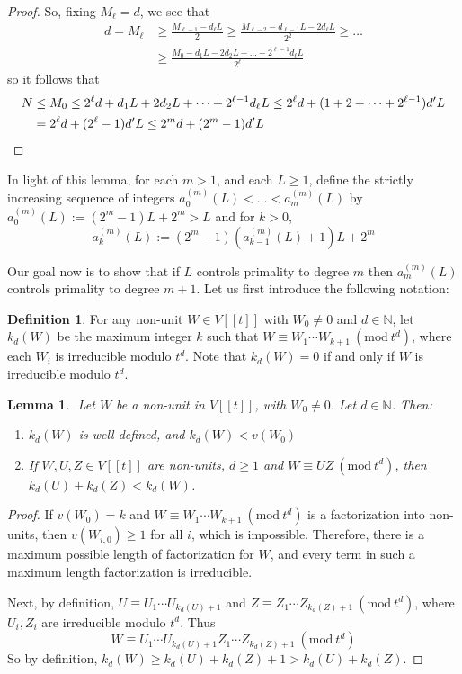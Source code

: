 \documentclass{article}
\newcommand{\N}{\mathbb{N}}
\newcommand{\Mod}[1]{\ (\mathrm{mod}\ #1)}
\theoremstyle{plain}
\newtheorem{lemma}[theorem]{Lemma}
\theoremstyle{definition}
\newtheorem{definition}[theorem]{Definition}
\theoremstyle{remark}
\theoremstyle{plain}
\begin{document}
\begin{proof}
\noindent So, fixing $M_\ell=d$, we see that 
\begin{align*}
d=M_\ell&\geq \frac{M_{\ell-1}-d_{\ell}L}{2}\geq \frac{M_{\ell-2}-d_{\ell-1}L-2d_{\ell}L}{2^2}\geq\dots\\&\geq\frac{M_0-d_1L-2d_2L-\dots-2^{\ell-1}d_\ell L}{2^\ell}
\end{align*} so it follows that 
\begin{align*}
N&\leq M_0\leq 2^\ell d+d_1L+2d_2L+\dots+2^{\ell-1}d_\ell L\leq 2^\ell d+(1+2+\dots+2^{\ell-1})d'L\\&=2^\ell d+(2^\ell-1)d'L\leq 2^md+(2^m-1)d'L\qedhere
\end{align*}

\end{proof}

\noindent In light of this lemma, for each $m>1$, and each $L\geq 1$, define the strictly increasing sequence of integers $a_0^{(m)}(L)<\dots<a_m^{(m)}(L)$ by $a_0^{(m)}(L):=(2^m-1)L+2^m>L$ and for $k>0$, $$a_k^{(m)}(L):=(2^m-1)(a_{k-1}^{(m)}(L)+1)L+2^m$$ %

\noindent Our goal now is to show that if $L$ controls primality to degree $m$ then $a_m^{(m)}(L)$ controls primality to degree $m+1$. Let us first introduce the following notation:

\begin{definition}
For any non-unit $W\in V[[t]]$ with $W_0 \neq 0$ and $d\in\mathbb{N}$, let $k_d(W)$ be the maximum integer $k$ such that $W\equiv W_1\cdots W_{k+1}\Mod{t^d}$, where each $W_i$ is irreducible modulo $t^d$. Note that $k_d(W)=0$ if and only if $W$ is irreducible modulo $t^d$.
\end{definition}

\begin{lemma}\label{reduced} $ $ Let $W$ be a non-unit in $V[[t]]$, with $W_0 \neq 0$. Let $d \in \N$. Then:
\begin{enumerate}
\item $k_d(W)$ is well-defined, and $k_d(W)< v(W_0)$

\item If $W,U,Z\in V[[t]]$ are non-units, $d\geq 1$ and $W\equiv UZ\Mod{t^d}$, then $k_d(U)+k_d(Z)<k_d(W)$.
\end{enumerate}
\end{lemma}

\begin{proof} If $v(W_0)=k$ and $W\equiv W_1\cdots W_{k+1}\Mod{t^d}$ is a factorization into non-units, then $v(W_{i,0})\geq 1$ for all $i$, which is impossible. Therefore, there is a maximum possible length of factorization for $W$, and every term in such a maximum length factorization is irreducible.

Next, by definition, $U\equiv U_1\cdots U_{k_d(U)+1}$ and $Z\equiv Z_1\cdots Z_{k_d(Z)+1}\Mod{t^d}$, where $U_i,Z_i$ are irreducible modulo $t^d$. Thus $$W\equiv U_1\cdots U_{k_d(U)+1}Z_1\cdots Z_{k_d(Z)+1}\Mod{t^d}$$ So by definition, $k_d(W)\geq k_d(U)+k_d(Z)+1>k_d(U)+k_d(Z)$.\qedhere


\end{proof}
\end{document}
